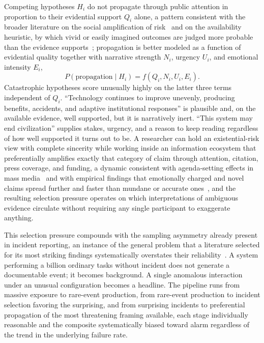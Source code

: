 \documentclass[11pt]{article}
\begin{document}
Competing hypotheses $H_i$ do not propagate through public attention in proportion to their evidential support $Q_i$ alone, a pattern consistent with the broader literature on the social amplification of risk~\cite{kasperson1988,slovic1987,slovic2000} and on the availability heuristic, by which vivid or easily imagined outcomes are judged more probable than the evidence supports~\cite{tverskykahneman1973,tverskykahneman1974,kahneman2011}; propagation is better modeled as a function of evidential quality together with narrative strength $N_i$, urgency $U_i$, and emotional intensity $E_i$,
\[
P(\text{propagation} \mid H_i) = f(Q_i, N_i, U_i, E_i).
\]
Catastrophic hypotheses score unusually highly on the latter three terms independent of $Q_i$. ``Technology continues to improve unevenly, producing benefits, accidents, and adaptive institutional responses'' is plausible and, on the available evidence, well supported, but it is narratively inert. ``This system may end civilization'' supplies stakes, urgency, and a reason to keep reading regardless of how well supported it turns out to be. A researcher can hold an existential-risk view with complete sincerity while working inside an information ecosystem that preferentially amplifies exactly that category of claim through attention, citation, press coverage, and funding, a dynamic consistent with agenda-setting effects in mass media~\cite{mccombs1972} and with empirical findings that emotionally charged and novel claims spread further and faster than mundane or accurate ones~\cite{vosoughi2018,berger2012}, and the resulting selection pressure operates on which interpretations of ambiguous evidence circulate without requiring any single participant to exaggerate anything.

This selection pressure compounds with the sampling asymmetry already present in incident reporting, an instance of the general problem that a literature selected for its most striking findings systematically overstates their reliability~\cite{ioannidis2005}. A system performing a billion ordinary tasks without incident does not generate a documentable event; it becomes background. A single anomalous interaction under an unusual configuration becomes a headline. The pipeline runs from massive exposure to rare-event production, from rare-event production to incident selection favoring the surprising, and from surprising incidents to preferential propagation of the most threatening framing available, each stage individually reasonable and the composite systematically biased toward alarm regardless of the trend in the underlying failure rate.
\end{document}
